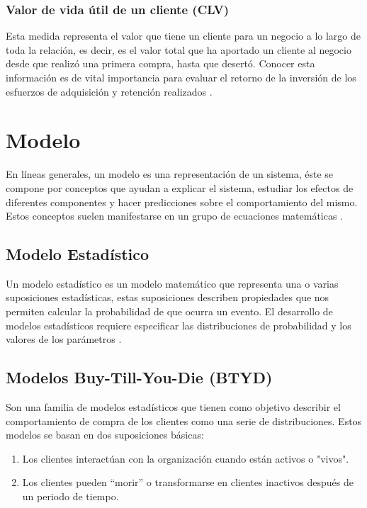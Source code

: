 \subsubsection{Valor de vida útil de un cliente (CLV)}

Esta medida representa el valor que tiene un cliente para un negocio a lo largo de toda la relación, es decir, es el valor total que ha aportado un cliente al negocio desde que realizó una primera compra, hasta que desertó. Conocer esta información es de vital importancia para evaluar el retorno de la inversión de los esfuerzos de adquisición y retención realizados \cite{gold2020}.

\section{Modelo}

En líneas generales, un modelo es una representación de un sistema, éste se compone por conceptos que ayudan a explicar el sistema, estudiar los efectos de diferentes componentes y hacer predicciones sobre el comportamiento del mismo. Estos conceptos suelen manifestarse en un grupo de ecuaciones matemáticas \cite{ando2010}.

\subsection{Modelo Estadístico}

Un modelo estadístico es un modelo matemático que representa una o varias suposiciones estadísticas, estas suposiciones describen propiedades que nos permiten calcular la probabilidad de que ocurra un evento. El desarrollo de modelos estadísticos requiere especificar las distribuciones de probabilidad y los valores de los parámetros \cite{ando2010}.

\subsection{Modelos Buy-Till-You-Die (BTYD)}

Son una familia de modelos estadísticos que tienen como objetivo describir el comportamiento de compra de los clientes como una serie de distribuciones. Estos modelos se basan en dos suposiciones básicas:

\begin{enumerate}
	\item Los clientes interactúan con la organización cuando están activos o "vivos".
	\item Los clientes pueden “morir” o transformarse en clientes inactivos después de un periodo de tiempo.
\end{enumerate}

